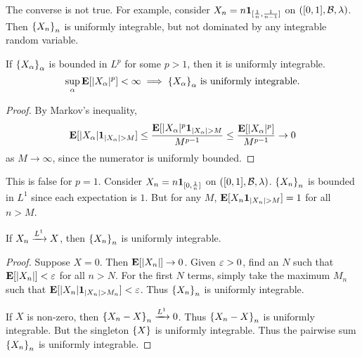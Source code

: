 \begin{remarks}
        The converse is not true.
        For example, consider $X_n = n \1{[\frac1n, \frac1{n-1}]}$
        on $([0, 1], \B, \lambda)$.
        Then ${\set{X_n}}_n$ is uniformly integrable, but not dominated by any
        integrable random variable.
    \item If ${\set{X_\alpha}}_\alpha$ is bounded in $L^p$ for some $p > 1$,
        then it is uniformly integrable.
        \[
            \sup_\alpha \E[\abs{X_\alpha}^p] < \infty \implies
                {\set{X_\alpha}}_\alpha \text{ is uniformly integrable.}
        \]
        \begin{proof}
            By Markov's inequality, \[
                \E[\abs{X_\alpha} \1{\abs{X_\alpha} > M}] \le
                    \frac{\E[\abs{X_\alpha}^p \1{\abs{X_\alpha} > M}}{M^{p-1}}
                    \le \frac{\E[\abs{X_\alpha}^p]}{M^{p-1}} \to 0
            \] as $M \to \infty$, since the numerator is uniformly bounded.
        \end{proof}
        This is false for $p = 1$.
        Consider $X_n = n\1{[0, \frac1n]}$ on $([0, 1], \B, \lambda)$.
        ${\set{X_n}}_n$ is bounded in $L^1$ since each expectation is $1$.
        But for any $M$, $\E[X_n \1{\abs{X_n} > M}] = 1$ for all $n > M$.
    \item If $X_n \lpto[1] X$, then ${\set{X_n}}_n$ is uniformly integrable.
        \begin{proof}
            Suppose $X = 0$.
            Then $\E[\abs{X_n}] \to 0$.
            Given $\eps > 0$, find an $N$ such that $\E[\abs{X_n}] < \eps$
            for all $n > N$.
            For the first $N$ terms, simply take the maximum $M_n$ such that
            $\E[\abs{X_n} \1{\abs{X_n} > M_n}] < \eps$.
            Thus ${\set{X_n}}_n$ is uniformly integrable.

            If $X$ is non-zero, then ${\set{X_n - X}}_n \lpto[1] 0$.
            Thus ${\set{X_n - X}}_n$ is uniformly integrable.
            But the singleton $\set X$ is uniformly integrable.
            Thus the pairwise sum ${\set{X_n}}_n$ is uniformly integrable.
        \end{proof}
\end{remarks}

